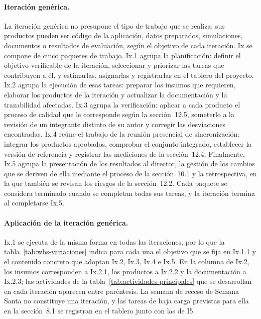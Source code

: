 \paragraph{Iteración genérica.}
La iteración genérica no presupone el tipo de trabajo que se realiza: sus productos pueden ser código de la aplicación, datos preparados, simulaciones, documentos o resultados de evaluación, según el objetivo de cada iteración. Ix se compone de cinco paquetes de trabajo. Ix.1 agrupa la planificación: definir el objetivo verificable de la iteración, seleccionar y priorizar las tareas que contribuyen a él, y estimarlas, asignarlas y registrarlas en el tablero del proyecto. Ix.2 agrupa la ejecución de esas tareas: preparar los insumos que requieren, elaborar los productos de la iteración y actualizar la documentación y la trazabilidad afectadas. Ix.3 agrupa la verificación: aplicar a cada producto el proceso de calidad que le corresponde según la sección~12.5, someterlo a la revisión de un integrante distinto de su autor y corregir las desviaciones encontradas. Ix.4 reúne el trabajo de la reunión presencial de sincronización: integrar los productos aprobados, comprobar el conjunto integrado, establecer la versión de referencia y registrar las mediciones de la sección~12.4. Finalmente, Ix.5 agrupa la presentación de los resultados al director, la gestión de los cambios que se deriven de ella mediante el proceso de la sección~10.1 y la retrospectiva, en la que también se revisan los riesgos de la sección~12.2. Cada paquete se considera terminado cuando se completan todas sus tareas, y la iteración termina al completarse Ix.5.

\paragraph{Aplicación de la iteración genérica.}
Ix.1 se ejecuta de la misma forma en todas las iteraciones, por lo que la tabla~\ref{tab:wbs-variaciones} indica para cada una el objetivo que se fija en Ix.1.1 y el contenido concreto que adoptan Ix.2, Ix.3, Ix.4 e Ix.5. En la columna de Ix.2, los insumos corresponden a Ix.2.1, los productos a Ix.2.2 y la documentación a Ix.2.3; las actividades de la tabla~\ref{tab:actividades-principales} que se desarrollan en cada iteración aparecen entre paréntesis. La semana de receso de Semana Santa no constituye una iteración, y las tareas de baja carga previstas para ella en la sección~8.1 se registran en el tablero junto con las de I5.

